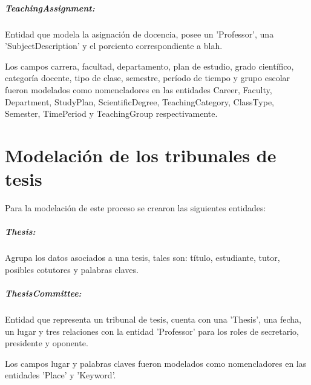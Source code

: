 \subparagraph{TeachingAssignment:}
Entidad que modela la asignación de docencia, posee un
'Professor', una 'SubjectDescription' y
el porciento correspondiente a blah.

Los campos carrera, facultad, departamento, plan de 
estudio, grado científico, categoría docente, tipo de 
clase, semestre, período de tiempo y grupo escolar fueron
modelados como nomencladores en las entidades Career,
Faculty, Department, StudyPlan, ScientificDegree, 
TeachingCategory, ClassType, Semester, TimePeriod y 
TeachingGroup respectivamente.


\section{Modelación de los tribunales de tesis}
Para la modelación de este proceso se crearon las 
siguientes entidades:

\subparagraph{Thesis:}
Agrupa los datos asociados a una tesis, tales son:
título, estudiante, tutor, posibles cotutores y palabras
claves.

\subparagraph{ThesisCommittee:}
Entidad que representa un tribunal de tesis, cuenta con 
una 'Thesis', una fecha, un lugar y tres relaciones con 
la entidad 'Professor' para los roles de
secretario, presidente y oponente.

Los campos lugar y palabras claves fueron modelados como
nomencladores en las entidades 'Place' y 'Keyword'.
